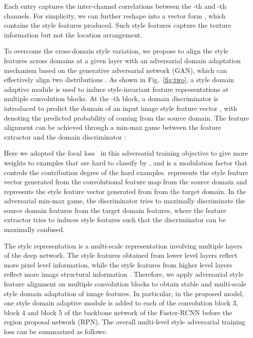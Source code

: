 \documentclass[runningheads]{llncs}
\begin{document}
Each entry  captures the inter-channel correlations between the -th and -th channels.
For simplicity, we can further reshape  into a vector form ,
which contains the style features produced. Such style features capture the texture information
but not the location arrangement.



To overcome the cross-domain style variation, we propose to align the style features across domains at a given layer
with an adversarial domain adaptation mechanism based on 
the generative adversarial network (GAN), 
which can effectively align two distributions
\cite{goodfellow2014generative}. 
As shown in Fig.~\ref{fig:two}, a style domain adaptive module is used to induce style-invariant feature representations
at multiple convolution blocks. 
At the -th block, a domain discriminator 
 is introduced to predict the domain of an input image style feature vector , 
with  denoting the predicted probability of  coming from the source domain. 
The feature alignment can be achieved through a min-max game between
the feature extractor  and the domain discriminator : 

Here we adopted the focal loss~\cite{lin2017focal,saito2019strong} in this adversarial training objective
to give more weights to examples that are hard to classify by ,
and  is a modulation factor that controls the contribution degree of the hard examples.
 represents the style feature vector generated 
from the convolutional feature map  from the source domain 
and  represents the style feature vector generated from 
from the target domain. 
In the adversarial min-max game, the discriminator  tries to maximally
discriminate the source domain features from the target domain features,
where the feature extractor  tries to induces style features such that
the discriminator can be maximally confused.  


The style representation is a multi-scale representation involving multiple layers of the deep network.
The style features obtained from lower level layers reflect more pixel level information,
while the style features from higher level layers reflect more image structural information
\cite{Gatys2016Image,JohnsonPerceptual}. 
Therefore, we apply adversarial style feature alignment on multiple convolution blocks 
to obtain stable and multi-scale style domain adaptation of image features. 
In particular, in the proposed model, one style domain adaptive module is 
added to each of the convolution block 3, block 4 and block 5 of the backbone network of 
the Faster-RCNN before the region proposal network (RPN).
The overall multi-level style adversarial training loss  can be summarized as follows:
\end{document}
